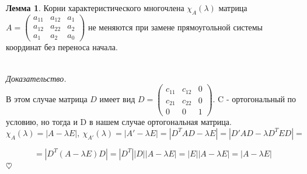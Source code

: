 \documentclass{article}
\theoremstyle{definition}
\newtheorem{lemma}{Лемма}[section]
\newenvironment{ourproof}{\textit{\\ Доказательство.\\ }}{$\hfill \heartsuit$}
\begin{document}
\begin{lemma}
Корни характеристического многочлена $\chi_{A} (\lambda)$ матрица $A =  \begin{pmatrix}
a_{11} & a_{12} & a_1  \\
a_{12} & a_{22} & a_2 \\
a_1 & a_2 & a_0
\end{pmatrix}$ не меняются при замене прямоугольной системы координат без переноса начала.

\begin{ourproof}
В этом случае матрица $D$ имеет вид $D =  \begin{pmatrix}
c_{11} & c_{12} & 0 \\
c_{21} & c_{22} & 0 \\
0 & 0 & 1
\end{pmatrix}$. C - ортогональный по условию, но тогда и D в нашем случае ортогональная матрица. 
$$\chi_A (\lambda) = |A - \lambda E|, \ \chi_{A'} (\lambda) = |A' - \lambda E| = |D^T A D - \lambda E| = |D' A D - \lambda D^T E D|  =$$

$$ =|D^T(A - \lambda E)D| = |D^T||D||A - \lambda E| = |E||A - \lambda E| = |A - \lambda E| $$
\end{ourproof}

\end{lemma}
\end{document}

